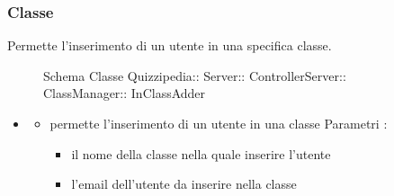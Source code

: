 \subsubsection{Classe }
Permette l'inserimento di un utente in una specifica classe.
\begin{figure}[H]
\centering
\noindent{}
\caption[Schema Classe InClassAdder]{Schema Classe Quizzipedia:: Server:: ControllerServer:: ClassManager:: InClassAdder}
\end{figure}
\begin{itemize}
\item {}
\begin{itemize}
\item {}
\newline
permette l'inserimento di un utente in una classe
\newline
Parametri :
\begin{itemize}
\item {}
\newline
il nome della classe nella quale inserire l'utente
\item {}
\newline
l'email dell'utente da inserire nella classe
\end{itemize}
\end{itemize}
\end{itemize}
